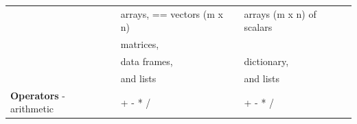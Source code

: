 \documentclass[]{book}
\theoremstyle{definition}
\theoremstyle{definition}
\theoremstyle{definition}
\theoremstyle{remark}
\begin{document}
\begin{longtable}[]{@{}lll@{}}
\begin{minipage}[t]{0.19\columnwidth}\raggedright\strut
\strut
\end{minipage} & \begin{minipage}[t]{0.33\columnwidth}\raggedright\strut
arrays, == vectors (m x n)\strut
\end{minipage} & \begin{minipage}[t]{0.39\columnwidth}\raggedright\strut
arrays (m x n) of scalars\strut
\end{minipage}\tabularnewline
\begin{minipage}[t]{0.19\columnwidth}\raggedright\strut
\strut
\end{minipage} & \begin{minipage}[t]{0.33\columnwidth}\raggedright\strut
matrices,\strut
\end{minipage} & \begin{minipage}[t]{0.39\columnwidth}\raggedright\strut
\strut
\end{minipage}\tabularnewline
\begin{minipage}[t]{0.19\columnwidth}\raggedright\strut
\strut
\end{minipage} & \begin{minipage}[t]{0.33\columnwidth}\raggedright\strut
data frames,\strut
\end{minipage} & \begin{minipage}[t]{0.39\columnwidth}\raggedright\strut
dictionary,\strut
\end{minipage}\tabularnewline
\begin{minipage}[t]{0.19\columnwidth}\raggedright\strut
\strut
\end{minipage} & \begin{minipage}[t]{0.33\columnwidth}\raggedright\strut
and lists\strut
\end{minipage} & \begin{minipage}[t]{0.39\columnwidth}\raggedright\strut
and lists\strut
\end{minipage}\tabularnewline
\begin{minipage}[t]{0.19\columnwidth}\raggedright\strut
\textbf{Operators} - arithmetic\strut
\end{minipage} & \begin{minipage}[t]{0.33\columnwidth}\raggedright\strut
+ - * /\strut
\end{minipage} & \begin{minipage}[t]{0.39\columnwidth}\raggedright\strut
+ - * /\strut
\end{minipage}\tabularnewline

\end{longtable}
\end{document}

